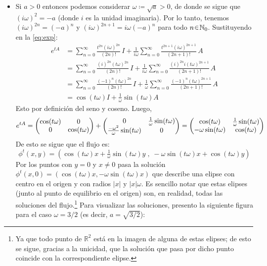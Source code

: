 \begin{sol}
\begin{itemize}

    \item Si $a>0$ entonces podemos considerar $\omega \coloneq \sqrt{a} > 0$, de donde se sigue que $(i\omega)^2 = -a$ (donde $i$ es la unidad imaginaria). Por lo tanto, tenemos $(i\omega)^{2n} = (-a)^n$ y $(i\omega)^{2n+1} = i\omega(-a)^n$ para todo $n \en \mathbb{N}_0$. Sustituyendo en la \cref{eq:exp}:
    \begin{align*}
    e^{tA}%
    &= \sum^\infty_{n=0} \frac{t^{2n}(i\omega)^{2n}}{(2n)!}\, I + \frac{1}{i\omega}\sum^\infty_{n=0} \frac{t^{2n+1}(i\omega)^{2n+1}}{(2n+1)!}\, A\\
    &= \sum^\infty_{n=0} \frac{(i)^{2n}(t\omega)^{2n}}{(2n)!}\, I + \frac{1}{i\omega}\sum^\infty_{n=0} \frac{(i)^{2n}i(t\omega)^{2n+1}}{(2n+1)!}\, A\\
    &= \sum^\infty_{n=0} \frac{(-1)^n(t\omega)^{2n}}{(2n)!}\, I + \frac{1}{\omega}\sum^\infty_{n=0} \frac{(-1)^n(t\omega)^{2n+1}}{(2n+1)!}\, A\\
    &= \cos(t\omega) I + \frac{1}{\omega}\sin(t\omega)A
    \end{align*}
    Esto por definición del seno y coseno. Luego, 
    \[
    e^{tA} = \mqty( \cos(t\omega) & 0 \\ 0 & \cos(t\omega)) + \mqty(0 & \frac{1}{\omega} \sin(t\omega) \\ \frac{-\omega^2}{\omega} 
    \sin(t\omega) & 0) = \mqty( \cos(t\omega) & \frac{1}{\omega} \sin(t\omega) \\ -\omega 
    \sin(t\omega) & \cos(t\omega))
    \]
    De esto se sigue que el flujo es:
    \[
    \phi^t(x,y) = \left(%
        \cos(t\omega) x + \tfrac{1}{\omega}\sin(t\omega) y\;,\;%
        -\omega\sin(t\omega) x + \cos(t\omega) y
    \right)
    \]
    Por los puntos con $y=0$ y $x\neq 0$ pasa la solución $\phi^t(x,0) = (\cos(t\omega)x, -\omega\sin(t\omega)x)$ que describe una elipse con centro en el origen y con radios $|x|$ y $|x|\omega$. Es sencillo notar que estas elipses (junto al punto de equilibrio en el origen) son, en realidad, todas las soluciones del flujo.\footnote{Ya que todo punto de $\mathbb{R}^2$ está en la imagen de alguna de estas elipses; de esto se sigue, gracias a la unicidad, que la solución que pasa por dicho punto coincide con la correspondiente elipse.}  Para visualizar las soluciones, presento la siguiente figura para el caso $\omega = 3/2$ (es decir, $a = \sqrt{3/2}$):
    \begin{center}
\end{center}
\end{itemize}
\end{sol}
